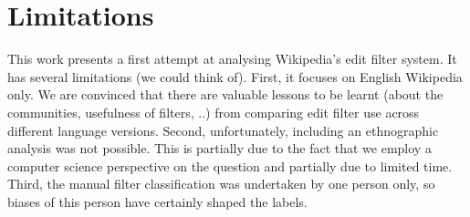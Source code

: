 \section{Limitations}

This work presents a first attempt at analysing Wikipedia's edit filter system.
It has several limitations (we could think of).
First, it focuses on English Wikipedia only.
We are convinced that there are valuable lessons to be learnt (about the communities, usefulness of filters, ..) from comparing edit filter use across different language versions.
Second, unfortunately, including an ethnographic analysis was not possible.
This is partially due to the fact that we employ a computer science perspective on the question and partially due to limited time.
Third, the manual filter classification was undertaken by one person only, so biases of this person have certainly shaped the labels.

